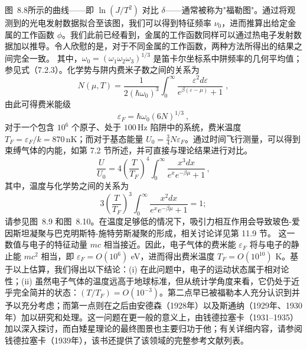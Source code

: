 图~8.8所示的曲线——即 \(\ln(J/T^2)\) 对比 \(\delta\)——通常被称为"福勒图"。通过将观测到的光电发射数据拟合至该图，我们可以得到特征频率 \(\nu_0\)，进而推算出给定金属的工作函数 \(\phi\)。我们此前已经看到，金属的工作函数同样可以通过热电子发射数据加以推导。令人欣慰的是，对于不同金属的工作函数，两种方法所得出的结果之间完全一致。
其中，\(\omega_{0}=(\omega_{1}\omega_{2}\omega_{3})^{1/3}\) 是笛卡尔坐标系中阱频率的几何平均值；参见式（7.2.3）。化学势与阱内费米子数之间的关系为
\begin{equation}\tag{8.3.28}\label{eq:8.3.28}
N ( \mu , T ) = \frac { 1 } { 2 \left( \hbar \omega _ { 0 } \right) ^{3} } \int _ { 0 } ^{\infty} \frac { \varepsilon ^{2} d \varepsilon } { e ^{\beta ( \varepsilon - \mu )} + 1 } \; ,
\end{equation}
由此可得费米能级
\begin{equation}\tag{8.3.29}\label{eq:8.3.29}
\varepsilon _ { F } = \hbar \omega _ { 0 } ( 6 N ) ^{1 / 3} \ ,
\end{equation}
对于一个包含 \(10^{6}\) 个原子、处于 \(100\,\mathrm{Hz}\) 陷阱中的系统，费米温度 \(T_{F}=\varepsilon_{F}/k=870\,\mathrm{nK}\)；而对于基态能量 \(U_{0}=\frac{3}{4}N\varepsilon_{F}\)。通过时间飞行测量，可以得到束缚气体的内能，如第 7.2 节所述，并可直接与理论结果进行对比。
\begin{equation}\tag{8.3.30}\label{eq:8.3.30}
\frac { U } { U _ { 0 } } = 4 \left( \frac { T } { T _ { F } } \right) ^{4} \int _ { 0 } ^{\infty} \frac { x ^{3} d x } { e ^{x} e ^{- \beta \mu} + 1 } \, ,
\end{equation}
其中，温度与化学势之间的关系为
\begin{equation}\tag{8.3.31}\label{eq:8.3.31}
3 \left( \frac { T } { T _ { F } } \right) ^{3} \int _ { 0 } ^{\infty} \frac { x ^{2} d x } { e ^{x} e ^{- \beta \mu} + 1 } = 1 ;
\end{equation}
请参见图~8.9 和图~8.10。在温度足够低的情况下，吸引力相互作用会导致玻色-爱因斯坦凝聚与巴克明斯特-施特劳斯凝聚的形成，相关讨论详见第 11.9 节。
这一数值与电子的特征动量 \(mc\) 相当接近。因此，电子气体的费米能 \(\varepsilon_{F}\) 将与电子的静止能 \(mc^{2}\) 相当，即 \(\varepsilon_{F}=O(10^{6})\) eV，进而得出费米温度 \(T_{F}=O(10^{10})\) K。基于以上估算，我们得出以下结论：(i) 在此问题中，电子的运动状态属于相对论性；(ii) 虽然电子气体的温度远高于地球标准，但从统计学角度来看，它仍处于近乎完全简并的状态：\((T/T_{F})=O(10^{-3})\)。第二点早已被福勒本人充分认识到并予以充分考虑；而第一点则在之后由安德森（1928年）以及斯通纳（1929年、1930年）加以研究和处理。这一问题在更一般的意义上，由钱德拉塞卡（1931--1935）加以深入探讨，而白矮星理论的最终图景也主要归功于他；有关详细内容，请参阅钱德拉塞卡（1939年），该书还提供了该领域的完整参考文献列表。
